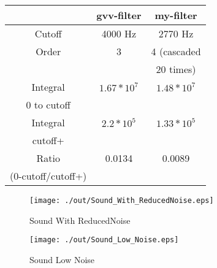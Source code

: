 \documentclass[journal,12pt]{IEEEtran}
\begin{document}
\begin{center}
  \begin{tabular}{ |c|c|c| }

    \hline
                       & \textbf{gvv-filter} & \textbf{my-filter} \\
    \hline
    Cutoff             & 4000 Hz             & 2770 Hz            \\
    \hline
    Order              & 3                   & 4 (cascaded        \\
                       &                     & 20 times)          \\
    \hline
    Integral           & $1.67*10^7$         & $1.48*10^7$        \\
    0 to cutoff        &                     &                    \\
    \hline
    Integral           & $2.2*10^5$          & $1.33*10^5$        \\
    cutoff+            &                     &                    \\
    \hline
    Ratio              & 0.0134              & 0.0089             \\
    (0-cutoff/cutoff+) &                     &                    \\
    \hline
  \end{tabular}
\end{center}

\begin{figure}[!h]
  \centering
  \texttt{[image: ./out/Sound\_With\_ReducedNoise.eps]}
  \caption{Sound With ReducedNoise}
\end{figure}

\begin{figure}[!h]
  \centering
  \texttt{[image: ./out/Sound\_Low\_Noise.eps]}
  \caption{Sound Low Noise}
\end{figure}
\end{document}
